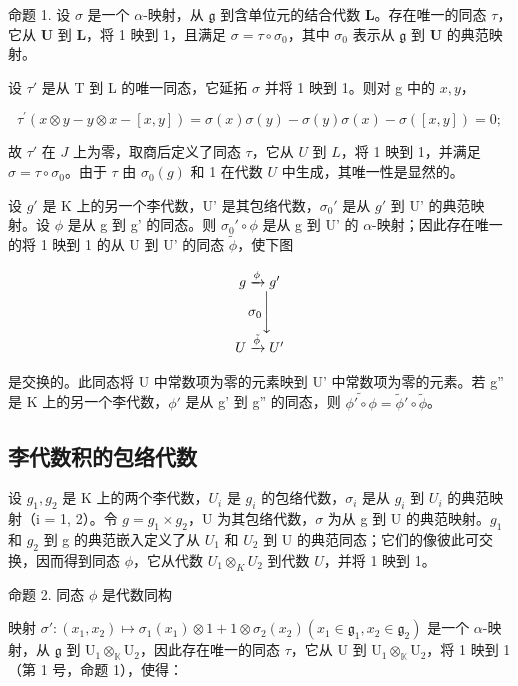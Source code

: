 命题 1. 设 \(\sigma\) 是一个 \(\alpha\)-映射，从 \(\mathfrak{g}\) 到含单位元的结合代数 \(\mathbf{L}\)。存在唯一的同态 \(\tau\)，它从 \(\mathbf{U}\) 到 \(\mathbf{L}\)，将 1 映到 1，且满足 \(\sigma = \tau \circ \sigma_0\)，其中 \(\sigma_0\) 表示从 \(\mathfrak{g}\) 到 \(\mathbf{U}\) 的典范映射。

设 \(\tau'\) 是从 T 到 L 的唯一同态，它延拓 \(\sigma\) 并将 1 映到 1。则对 g 中的 \(x, y\)，

\[
\tau^ {\prime} (x \otimes y - y \otimes x - [ x, y ]) = \sigma (x) \sigma (y) - \sigma (y) \sigma (x) - \sigma ([ x, y ]) = 0;
\]

故 \(\tau'\) 在 \(J\) 上为零，取商后定义了同态 \(\tau\)，它从 \(U\) 到 \(L\)，将 1 映到 1，并满足 \(\sigma = \tau \circ \sigma_0\)。由于 \(\tau\) 由 \(\sigma_0(g)\) 和 1 在代数 \(U\) 中生成，其唯一性是显然的。

设 \(g'\) 是 K 上的另一个李代数，U' 是其包络代数，\(\sigma_0'\) 是从 \(g'\) 到 U' 的典范映射。设 \(\phi\) 是从 g 到 g' 的同态。则 \(\sigma_0' \circ \phi\) 是从 g 到 U' 的 \(\alpha\)-映射；因此存在唯一的将 1 映到 1 的从 U 到 U' 的同态 \(\tilde{\phi}\)，使下图

\[
\begin{array}{c} g \xrightarrow {\phi} g ^ {\prime} \\ \sigma_ {0} \Biggl \downarrow \\ U \xrightarrow {\tilde {\phi}} U ^ {\prime} \end{array}
\]

是交换的。此同态将 U 中常数项为零的元素映到 U' 中常数项为零的元素。若 g'' 是 K 上的另一个李代数，\(\phi'\) 是从 g' 到 g'' 的同态，则 \(\widetilde{\phi'\circ\phi}=\widetilde{\phi}'\circ\widetilde{\phi}\)。

\subsection{李代数积的包络代数}

设 \(g_{1}, g_{2}\) 是 K 上的两个李代数，\(U_{i}\) 是 \(g_{i}\) 的包络代数，\(\sigma_{i}\) 是从 \(g_{i}\) 到 \(U_{i}\) 的典范映射（i = 1, 2）。令 \(g = g_{1} \times g_{2}\)，U 为其包络代数，\(\sigma\) 为从 g 到 U 的典范映射。\(g_{1}\) 和 \(g_{2}\) 到 g 的典范嵌入定义了从 \(U_{1}\) 和 \(U_{2}\) 到 U 的典范同态；它们的像彼此可交换，因而得到同态 \(\phi\)，它从代数 \(U_1 \otimes_K U_2\) 到代数 \(U\)，并将 1 映到 1。

命题 2. 同态 \(\phi\) 是代数同构

映射 \(\sigma': (x_1, x_2) \mapsto \sigma_1(x_1) \otimes 1 + 1 \otimes \sigma_2(x_2) (x_1 \in \mathfrak{g}_1, x_2 \in \mathfrak{g}_2)\) 是一个 \(\alpha\)-映射，从 \(\mathfrak{g}\) 到 \(\mathrm{U}_1 \otimes_{\mathbb{K}} \mathrm{U}_2\)，因此存在唯一的同态 \(\tau\)，它从 \(\mathrm{U}\) 到 \(\mathrm{U}_1 \otimes_{\mathbb{K}} \mathrm{U}_2\)，将 1 映到 1（第 1 号，命题 1），使得：

